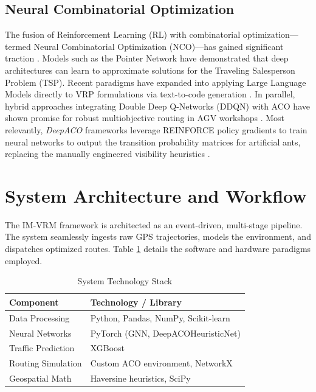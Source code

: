\documentclass[conference]{IEEEtran}
\begin{document}
\subsection{Neural Combinatorial Optimization}
The fusion of Reinforcement Learning (RL) with combinatorial optimization—termed Neural Combinatorial Optimization (NCO)—has gained significant traction \cite{nco_bengio}. Models such as the Pointer Network have demonstrated that deep architectures can learn to approximate solutions for the Traveling Salesperson Problem (TSP). Recent paradigms have expanded into applying Large Language Models directly to VRP formulations via text-to-code generation \cite{llm_vrp_ref}. In parallel, hybrid approaches integrating Double Deep Q-Networks (DDQN) with ACO have shown promise for robust multiobjective routing in AGV workshops \cite{mdpi_aco}. Most relevantly, \textit{DeepACO} frameworks leverage REINFORCE policy gradients to train neural networks to output the transition probability matrices for artificial ants, replacing the manually engineered visibility heuristics \cite{deep_aco_ref}.

\section{System Architecture and Workflow}
\label{sec:architecture}

The IM-VRM framework is architected as an event-driven, multi-stage pipeline. The system seamlessly ingests raw GPS trajectories, models the environment, and dispatches optimized routes. Table \ref{tab:tech_stack} details the software and hardware paradigms employed.

\begin{table}[htbp]
\centering
\caption{System Technology Stack}
\label{tab:tech_stack}
\begin{tabular}{@{}ll@{}}
\toprule
\textbf{Component} & \textbf{Technology / Library} \\ \midrule
Data Processing & Python, Pandas, NumPy, Scikit-learn \\
Neural Networks & PyTorch (GNN, DeepACOHeuristicNet) \\
Traffic Prediction & XGBoost \\
Routing Simulation & Custom ACO environment, NetworkX \\
Geospatial Math & Haversine heuristics, SciPy \\ \bottomrule
\end{tabular}
\end{table}
\end{document}
